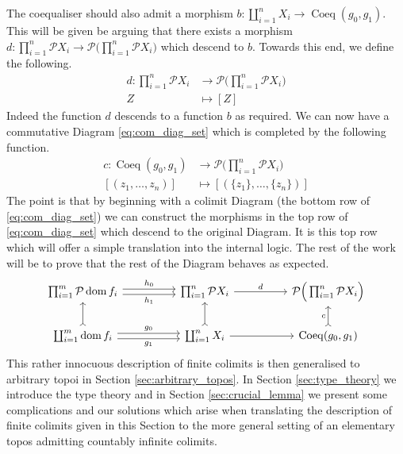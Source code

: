 \documentclass{birkjour}
\theoremstyle{plain}
\theoremstyle{definition}
\newcommand{\call}[1]{\mathcal{#1}}
\newcommand{\lto}{\longrightarrow}
\begin{document}
	The coequaliser should also admit a morphism $b: \coprod_{i = 1}^n X_i \lto \operatorname{Coeq}(g_0,g_1)$. This will be given be arguing that there exists a morphism $d: \prod_{i = 1}^n \call{P}X_i \lto \call{P}\Big(\prod_{i =1 }^n \call{P}X_i\Big)$ which descend to $b$. Towards this end, we define the following.
	\begin{align*}
		d: \prod_{i = 1}^n\call{P}X_i &\lto \call{P}\Big(\prod_{i = 1}^n \call{P}X_i\Big)\\
		Z &\longmapsto [Z]
	\end{align*}
	Indeed the function $d$ descends to a function $b$ as required. We can now have a commutative Diagram \eqref{eq:com_diag_set} which is completed by the following function.
	\begin{align*}
		c: \operatorname{Coeq}(g_0,g_1) &\lto \call{P}\Big(\prod_{i = 1}^n \call{P}X_i\Big)\\
		[(z_1,\hdots,z_n)] &\longmapsto [(\lbrace z_1 \rbrace, \hdots, \lbrace z_n \rbrace)]
	\end{align*}
	The point is that by beginning with a colimit Diagram (the bottom row of \eqref{eq:com_diag_set}) we can construct the morphisms in the top row of \eqref{eq:com_diag_set} which descend to the original Diagram. It is this top row which will offer a simple translation into the internal logic. The rest of the work will be to prove that the rest of the Diagram behaves as expected.
	\begin{equation}\label{eq:com_diag_set}
		\begin{tikzcd}[column sep = huge]
			\prod_{i = 1}^m \call{P}\operatorname{dom}f_i\arrow[r,shift left, "{h_0}"]\arrow[r,shift right,swap, "{h_1}"] & \prod_{i = 1}^n \call{P}X_i\arrow[r,"{d}"] & \call{P}\Big(\prod_{i = 1}^n \call{P}X_i\Big)\\
			\coprod_{i = 1}^m \operatorname{dom}f_i\arrow[u,rightarrowtail]\arrow[r,shift left, "{g_0}"]\arrow[r,shift right, swap, "{g_1}"] & \coprod_{i = 1}^n X_i\arrow[u,rightarrowtail]\arrow[r] & \operatorname{Coeq}(g_0,g_1)\arrow[u,rightarrowtail, "{c}"]
		\end{tikzcd}
	\end{equation}
	This rather innocuous description of finite colimits is then generalised to arbitrary topoi in Section \ref{sec:arbitrary_topos}. In Section \ref{sec:type_theory} we introduce the type theory and in Section \ref{sec:crucial_lemma} we present some complications and our solutions which arise when translating the description of finite colimits given in this Section to the more general setting of an elementary topos admitting countably infinite colimits.
	
\end{document}
